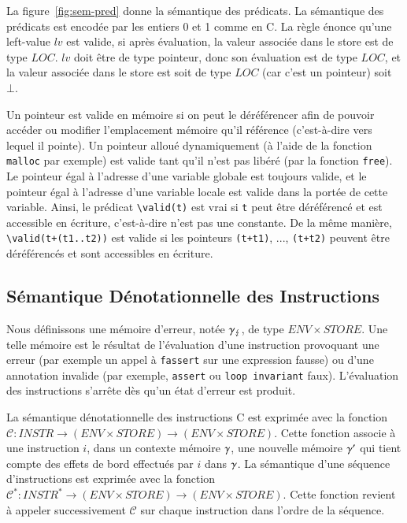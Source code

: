 La figure~\ref{fig:sem-pred} donne la sémantique des prédicats.
La sémantique des prédicats est encodée par les entiers 0 et 1 comme en C.
La règle  énonce qu'une left-value $\mathit{lv}$ est valide,
si après évaluation, la valeur associée dans le store est de type $LOC$.
$\mathit{lv}$ doit être de type pointeur, donc son évaluation est de type
$LOC$, et la valeur associée dans le store est soit de type $LOC$ (car c'est
un pointeur) soit $\bot$.

Un pointeur est valide en mémoire si on peut le déréférencer afin de pouvoir
accéder ou modifier l'emplacement mémoire qu'il référence (c'est-à-dire vers
lequel il pointe).
Un pointeur alloué dynamiquement (à l'aide de la fonction \lstinline'malloc' par
exemple) est valide tant qu'il n'est pas libéré (par la fonction
\lstinline'free').
Le pointeur égal à l'adresse d'une variable globale est toujours valide, et le
pointeur égal à l'adresse d'une variable locale est valide dans la portée de
cette variable.
Ainsi, le prédicat \lstinline'\valid(t)' est vrai si \lstinline't'
peut être déréférencé et est accessible en écriture, c'est-à-dire n'est pas une
constante.
De la même manière, \lstinline'\valid(t+(t1..t2))' est valide si les pointeurs
\lstinline'(t+t1)', ..., \lstinline'(t+t2)' peuvent être déréférencés et sont
accessibles en écriture.




\subsection{Sémantique Dénotationnelle des Instructions}

Nous définissons une mémoire d'erreur, notée $\gamma_\lightning$, de type
$ENV \times STORE$.
Une telle mémoire est le résultat de l'évaluation d'une instruction
provoquant une erreur (par exemple un appel à \lstinline'fassert' sur une
expression fausse) ou d'une annotation invalide (par exemple,
\lstinline'assert' ou \lstinline'loop invariant' faux).
L'évaluation des instructions s'arrête dès qu'un état d'erreur est produit.

La sémantique dénotationnelle des instructions C est exprimée avec la fonction
$\mathcal{C} : INSTR \rightarrow (ENV \times STORE) \rightarrow (ENV \times STORE)$.
Cette fonction associe à une instruction $i$, dans un contexte mémoire $\gamma$,
une nouvelle mémoire $\gamma'$ qui tient compte des effets de bord effectués par
$i$ dans $\gamma$.
La sémantique d'une séquence d'instructions est exprimée avec la fonction
$\mathcal{C}^{*} : INSTR^{*} \rightarrow (ENV \times STORE) \rightarrow (ENV \times STORE)$.
Cette fonction revient à appeler successivement $\mathcal{C}$ sur chaque
instruction dans l'ordre de la séquence.

